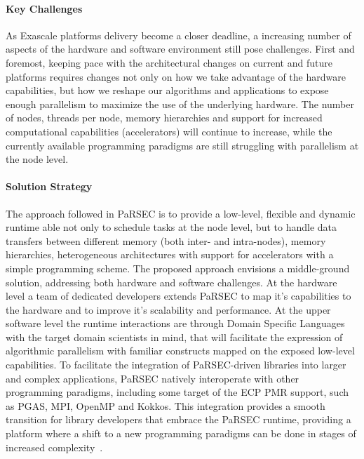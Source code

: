 \paragraph{Key Challenges}

As Exascale platforms delivery become a closer deadline, a increasing number of
aspects of the hardware and software environment still pose challenges. First
and foremost, keeping pace with the architectural changes on current and future
platforms requires changes not only on how we take advantage of the hardware
capabilities, but how we reshape our algorithms and applications to expose
enough parallelism to maximize the use of the underlying hardware. The number of
nodes, threads per node, memory hierarchies and support for increased
computational capabilities (accelerators) will continue to increase, while the
currently available programming paradigms are still struggling with parallelism
at the node level.

\paragraph{Solution Strategy}
The approach followed in PaRSEC is to provide a low-level, flexible and dynamic
runtime able not only to schedule tasks at the node level, but to handle data
transfers between different memory (both inter- and intra-nodes), memory
hierarchies, heterogeneous architectures with support for accelerators with a
simple programming scheme. The proposed approach envisions a middle-ground
solution, addressing both hardware and software challenges. At the hardware
level a team of dedicated developers extends PaRSEC to map it's capabilities to
the hardware and to improve it's scalability and performance. At the upper
software level the runtime interactions are through Domain Specific Languages
with the target domain scientists in mind, that will facilitate the expression
of algorithmic parallelism with familiar constructs mapped on the exposed
low-level capabilities. To facilitate the integration of PaRSEC-driven libraries
into larger and complex applications, PaRSEC natively interoperate with other
programming paradigms, including some target of the ECP PMR support, such as
PGAS, MPI, OpenMP and Kokkos. This integration provides a smooth transition for
library developers that embrace the PaRSEC runtime, providing a platform where a
shift to a new programming paradigms can be done in stages of increased
complexity~\cite{lorapo-protools,BLR_LU,parsec_pdgemm}.

